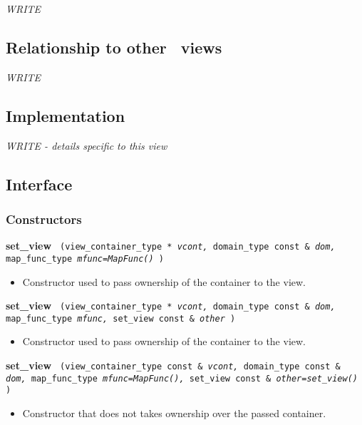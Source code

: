 \textit{WRITE}

\subsection{Relationship to other \stapl\ views}

\textit{WRITE}

\subsection{Implementation}

\textit{WRITE - details specific to this view}

\subsection{Interface} \label{sec-set-vw-inter}

\subsubsection{Constructors}

\noindent
\textbf{set\_view}%
\texttt{%
(view\_container\_type *
\textit{vcont,}%
domain\_type const \&
\textit{dom,}%
map\_func\_type
\textit{mfunc=MapFunc()}%
)
}

\begin{itemize}
\item
Constructor used to pass ownership of the container to the view.
\end{itemize}

\noindent
\textbf{set\_view}%
\texttt{%
(view\_container\_type *
\textit{vcont,}%
domain\_type const \&
\textit{dom, }%
map\_func\_type
\textit{mfunc,}%
set\_view const \&
\textit{other}%
)
}

\begin{itemize}
\item
Constructor used to pass ownership of the container to the view.
\end{itemize}

\noindent
\textbf{set\_view}%
\texttt{%
(view\_container\_type const \&
\textit{vcont,}%
domain\_type const \&
\textit{dom,}%
map\_func\_type
\textit{mfunc=MapFunc(),}%
set\_view const \&
\textit{other=set\_view()}%
)
}

\begin{itemize}
\item
Constructor that does not takes ownership over the passed container.
\end{itemize}

